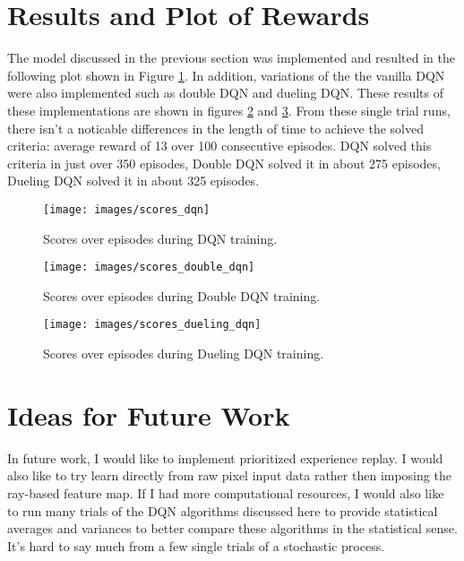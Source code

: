 \documentclass[12]{article}
\begin{document}
\section{Results and Plot of Rewards}
The model discussed in the previous section was implemented and resulted in the following plot shown in Figure \ref{fig:dqn}. In addition, variations of the the vanilla DQN were also implemented such as double DQN and dueling DQN. These results of these implementations are shown in figures \ref{fig:double_dqn} and \ref{fig:dueling_dqn}. From these single trial runs, there isn't a noticable differences in the length of time to achieve the solved criteria: average reward of 13 over 100 consecutive episodes. DQN solved this criteria in just over 350 episodes, Double DQN solved it in about 275 episodes, Dueling DQN solved it in about 325 episodes.


\begin{figure}
\texttt{[image: images/scores\_dqn]}
\caption{Scores over episodes during DQN training.}
\label{fig:dqn}
\end{figure}


\begin{figure}
\texttt{[image: images/scores\_double\_dqn]}
\caption{Scores over episodes during Double DQN training.}
\label{fig:double_dqn}
\end{figure}

\begin{figure}
\texttt{[image: images/scores\_dueling\_dqn]}
\caption{Scores over episodes during Dueling DQN training.}
\label{fig:dueling_dqn}
\end{figure}

\section{Ideas for Future Work}
In future work, I would like to implement prioritized experience replay. I would also like to try learn directly from raw pixel input data rather then imposing the ray-based feature map. If I had more computational resources, I would also like to run many trials of the DQN algorithms discussed here to provide statistical averages and variances to better compare these algorithms in the statistical sense. It's hard to say much from a few single trials of a stochastic process.




\end{document}
